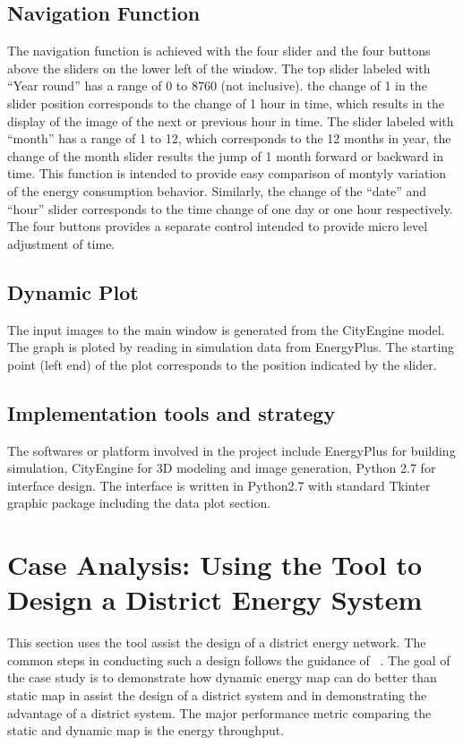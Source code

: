 \documentclass[hidelinks,12pt]{article}
\begin{document}
\subsection {Navigation Function}
The navigation function is achieved with the four slider and the four
buttons above the sliders on the lower left of the window. The top
slider labeled with ``Year round'' has a range of 0 to 8760 (not
inclusive). the change of 1 in the slider position corresponds to the
change of 1 hour in time, which results in the display of the image of
the next or previous hour in time. The slider labeled with ``month''
has a range of 1 to 12, which corresponds to the 12 months in year,
the change of the month slider results the jump of 1 month forward or
backward in time. This function is intended to provide easy comparison
of montyly variation of the energy consumption behavior. Similarly,
the change of the ``date'' and ``hour'' slider corresponds to the time
change of one day or one hour respectively. The four buttons provides
a separate control intended to provide micro level adjustment of time.

\subsection {Dynamic Plot}
The input images to the main window is generated from the CityEngine
model. The graph is ploted by reading in simulation data from
EnergyPlus. The starting point (left end) of the plot corresponds to
the position indicated by the slider. 
\subsection {Implementation tools and strategy}
The softwares or platform involved in the project include EnergyPlus
for building simulation, CityEngine for 3D modeling and image
generation, Python 2.7 for interface design. The interface is written
in Python2.7 with standard Tkinter graphic package including the data
plot section.
\section{Case Analysis: Using the Tool to Design a District Energy System}
This section uses the tool assist the design of a district energy
network. The common steps in conducting such a design follows the
guidance of ~\cite{IDEA2012}. The goal of the case study is to
demonstrate how dynamic energy map can do better than static map in
assist the design of a district system and in demonstrating the
advantage of a district system. The major performance metric comparing
the static and dynamic map is the energy throughput.
\end{document}
